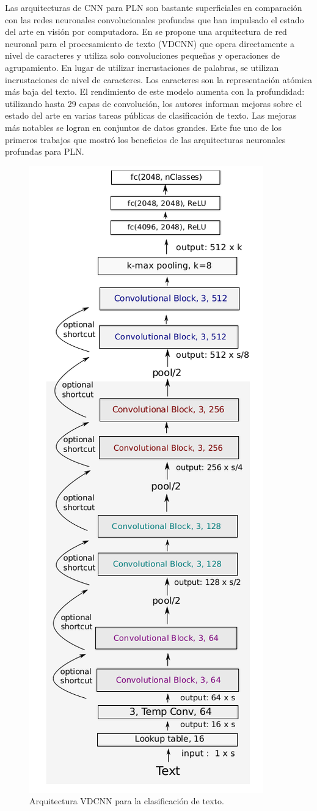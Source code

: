 Las arquitecturas de CNN para PLN son bastante superficiales en comparación con las redes neuronales convolucionales profundas que han impulsado el estado del arte en visión por computadora. En \cite{conneau2017very} se propone una arquitectura de red neuronal para el procesamiento de texto (VDCNN) que opera directamente a nivel de caracteres y utiliza solo convoluciones pequeñas y operaciones de agrupamiento. En lugar de utilizar incrustaciones de palabras, se utilizan incrustaciones de nivel de caracteres. Los caracteres son la representación atómica más baja del texto. El rendimiento de este modelo aumenta con la profundidad: utilizando hasta 29 capas de convolución, los autores informan mejoras sobre el estado del arte en varias tareas públicas de clasificación de texto. Las mejoras más notables se logran en conjuntos de datos grandes. Este fue uno de los primeros trabajos que mostró los beneficios de las arquitecturas neuronales profundas para PLN.

\begin{figure}[h]
  \centering
  \includegraphics[scale=0.2]{pics/VDCNN.png}
  \caption{Arquitectura VDCNN para la clasificación de texto.}
  \label{fig:vdcnn}
\end{figure}

